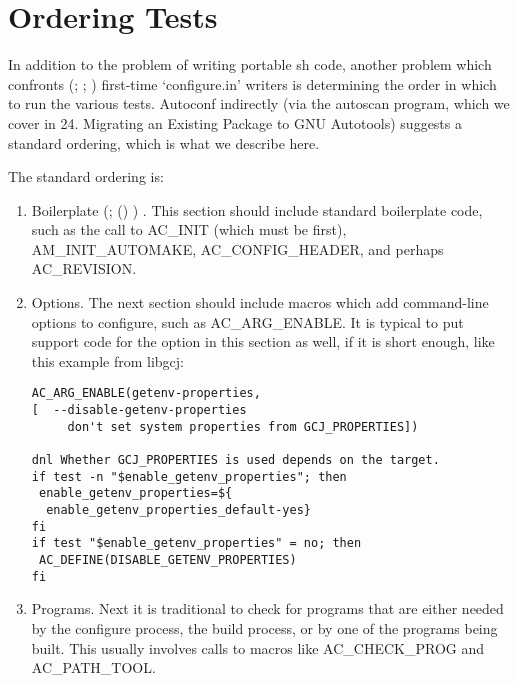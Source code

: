 \section{Ordering Tests}


In addition to the problem of writing portable sh code, another problem which 
confronts ({\MjQ{}}; {\McQ{}}; {\MjQ{}}) first-time `configure.in' writers is determining the order in which to run the various tests. Autoconf indirectly (via the autoscan program, which we cover in 24. Migrating an Existing Package to GNU Autotools) suggests a standard ordering, which is what we describe here. 


The standard ordering is:
\begin{enumerate}
\item Boilerplate ({\MbQ{}}; ({\MbQ{}}) {\McQ{}}) . This section 
should include standard boilerplate code,
such as the call to AC\_{}INIT (which must be first),
AM\_{}INIT\_{}AUTOMAKE, AC\_{}CONFIG\_{}HEADER, and perhaps AC\_{}REVISION. 

\item Options. The next section should include macros which add 
command-line options to configure, such as AC\_{}ARG\_{}ENABLE.
It is typical to put support code for the option in this section as well,
if it is short enough, like this example from libgcj: 

\begin{Verbatim}[frame=single]
AC_ARG_ENABLE(getenv-properties,
[  --disable-getenv-properties
     don't set system properties from GCJ_PROPERTIES])

dnl Whether GCJ_PROPERTIES is used depends on the target.
if test -n "$enable_getenv_properties"; then
 enable_getenv_properties=${
  enable_getenv_properties_default-yes}
fi
if test "$enable_getenv_properties" = no; then
 AC_DEFINE(DISABLE_GETENV_PROPERTIES)
fi
\end{Verbatim}

\item Programs. Next it is traditional to check for programs that are either needed by the configure process, the build process, or by one of the programs being built. This usually involves calls to macros like 
AC\_{}CHECK\_{}PROG and AC\_{}PATH\_{}TOOL. 


\end{enumerate}

